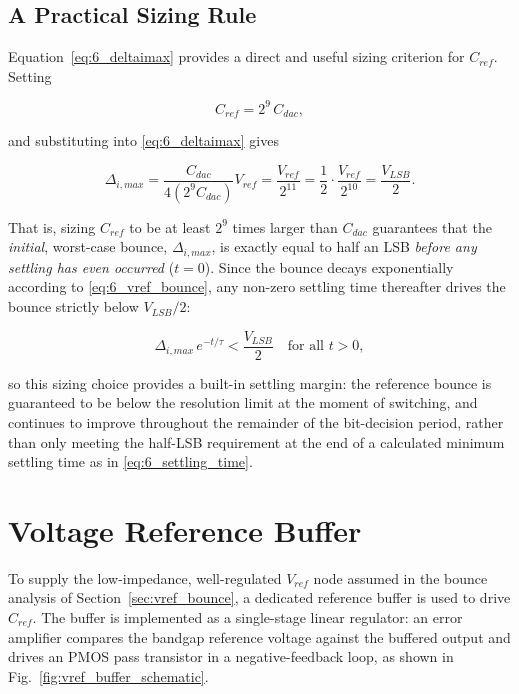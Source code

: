 \subsection{A Practical Sizing Rule}

Equation~\eqref{eq:6_deltaimax} provides a direct and useful sizing
criterion for $C_{ref}$. Setting

\begin{equation}
	C_{ref} = 2^9 \, C_{dac},
	\label{eq:6_cref_rule}
\end{equation}

\noindent and substituting into \eqref{eq:6_deltaimax} gives

\begin{equation}
	\Delta_{i,max} = \frac{C_{dac}}{4 \left(2^9 C_{dac}\right)} V_{ref}
	= \frac{V_{ref}}{2^{11}} = \frac{1}{2}\cdot\frac{V_{ref}}{2^{10}}
	= \frac{V_{LSB}}{2}.
	\label{eq:6_cref_rule_result}
\end{equation}

That is, sizing $C_{ref}$ to be at least $2^9$ times larger than $C_{dac}$
guarantees that the \emph{initial}, worst-case bounce, $\Delta_{i,max}$,
is exactly equal to half an LSB \emph{before any settling has even
	occurred} ($t = 0$). Since the bounce decays exponentially according to
\eqref{eq:6_vref_bounce}, any non-zero settling time thereafter drives
the bounce strictly below $V_{LSB}/2$:

\begin{equation}
	\Delta_{i,max}\, e^{-t/\tau} < \frac{V_{LSB}}{2}
	\quad \text{for all } t > 0,
	\label{eq:6_cref_rule_margin}
\end{equation}

\noindent so this sizing choice provides a built-in settling margin: the
reference bounce is guaranteed to be below the resolution limit at the
moment of switching, and continues to improve throughout the remainder of
the bit-decision period, rather than only meeting the half-LSB
requirement at the end of a calculated minimum settling time as in
\eqref{eq:6_settling_time}.
\section{Voltage Reference Buffer}
\label{sec:vref_buffer}

To supply the low-impedance, well-regulated $V_{ref}$ node assumed in the
bounce analysis of Section~\ref{sec:vref_bounce}, a dedicated reference
buffer is used to drive $C_{ref}$. The buffer is implemented as a
single-stage linear regulator: an error amplifier compares the bandgap
reference voltage against the buffered output and drives an PMOS pass
transistor in a negative-feedback loop, as shown in
Fig.~\ref{fig:vref_buffer_schematic}.

